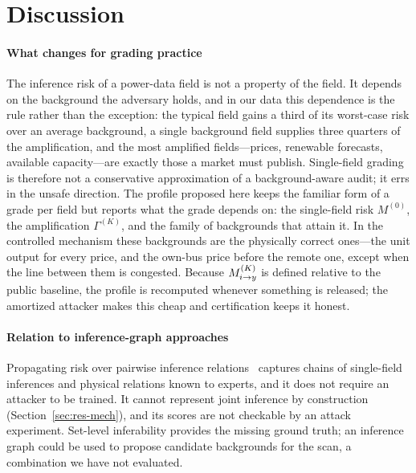 \section{Discussion}\label{sec:discussion}

\paragraph{What changes for grading practice}
The inference risk of a power-data field is not a property of the field. It depends on the background
the adversary holds, and in our data this dependence is the rule rather than the exception: the
typical field gains a third of its worst-case risk over an average background, a single background
field supplies three quarters of the amplification, and the most amplified fields---prices, renewable
forecasts, available capacity---are exactly those a market must publish. Single-field grading is
therefore not a conservative approximation of a background-aware audit; it errs in the unsafe
direction. The profile proposed here keeps the familiar form of a grade per field but reports what the
grade depends on: the single-field risk $M^{(0)}$, the amplification $\Gamma^{(K)}$, and the family of
backgrounds that attain it. In the controlled mechanism these backgrounds are the physically correct
ones---the unit output for every price, and the own-bus price before the remote one, except when the
line between them is congested. Because $M^{(K)}_{i \to y}$ is defined relative to the public baseline, the profile
is recomputed whenever something is released; the amortized attacker makes this cheap and
certification keeps it honest.

\paragraph{Relation to inference-graph approaches}
Propagating risk over pairwise inference relations~\cite{hu2026ignn} captures chains of
single-field inferences and physical relations known to experts, and it does not require an
attacker to be trained. It cannot represent joint inference by construction (Section~\ref{sec:res-mech}),
and its scores are not checkable by an attack experiment. Set-level inferability provides the
missing ground truth; an inference graph could be used to propose candidate backgrounds for the
scan, a combination we have not evaluated.

